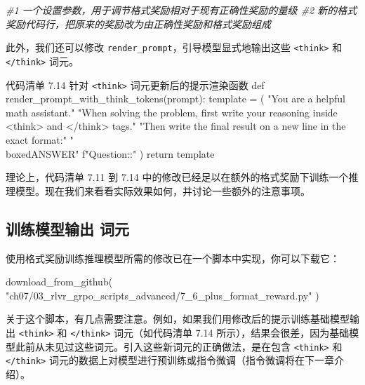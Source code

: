 {\noindent\small\textit{\#1 一个设置参数，用于调节格式奖励相对于现有正确性奖励的量级 \newline \#2 新的格式奖励代码行，把原来的奖励改为由正确性奖励和格式奖励组成}\par}

此外，我们还可以修改 \texttt{render\_prompt}，引导模型显式地输出这些 \texttt{\textless{}think\textgreater{}} 和 \texttt{\textless{}/think\textgreater{}} 词元。

\begin{codeboxt}{代码清单 7.14 针对 \texttt{\textless{}think\textgreater{}} 词元更新后的提示渲染函数}
def render_prompt_with_think_tokens(prompt):
    template = (
        "You are a helpful math assistant.\n"
        "When solving the problem, first write your reasoning inside <think> and </think> tags.\n"
        "Then write the final result on a new line in the exact format:\n"
        "\\boxed{ANSWER}\n\n"
        f"Question:\n\nAnswer:"
    )
    return template
\end{codeboxt}

理论上，代码清单 7.11 到 7.14 中的修改已经足以在额外的格式奖励下训练一个推理模型。现在我们来看看实际效果如何，并讨论一些额外的注意事项。

\subsection{训练模型输出 词元}

使用格式奖励训练推理模型所需的修改已在一个脚本中实现，你可以下载它：

\begin{codebox}
download_from_github(
    "ch07/03_rlvr_grpo_scripts_advanced/7_6_plus_format_reward.py"
)
\end{codebox}

关于这个脚本，有几点需要注意。例如，如果我们用修改后的提示训练基础模型输出 \texttt{\textless{}think\textgreater{}} 和 \texttt{\textless{}/think\textgreater{}} 词元（如代码清单 7.14 所示），结果会很差，因为基础模型此前从未见过这些词元。引入这些新词元的正确做法，是在包含 \texttt{\textless{}think\textgreater{}} 和 \texttt{\textless{}/think\textgreater{}} 词元的数据上对模型进行预训练或指令微调（指令微调将在下一章介绍）。

